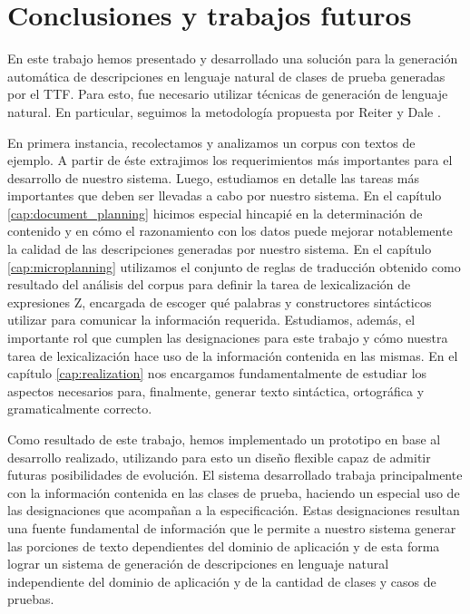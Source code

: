 \chapter{Conclusiones y trabajos futuros}
\label{cap:conclusion}

En este trabajo hemos presentado y desarrollado una solución para la generación automática de descripciones en lenguaje natural de clases de prueba generadas por el TTF. Para esto, fue necesario utilizar técnicas de generación de lenguaje natural. En particular, seguimos la metodología propuesta por Reiter y Dale \cite{reiter_dale}.

En primera instancia, recolectamos y analizamos un corpus con textos de ejemplo. A partir de éste extrajimos los requerimientos más importantes para el desarrollo de nuestro sistema. Luego, estudiamos en detalle las tareas más importantes que deben ser llevadas a cabo por nuestro sistema. En el capítulo \ref{cap:document_planning} hicimos especial hincapié en la determinación de contenido y en cómo el razonamiento con los datos puede mejorar notablemente la calidad de las descripciones generadas por nuestro sistema. En el capítulo \ref{cap:microplanning} utilizamos el conjunto de reglas de traducción obtenido como resultado del análisis del corpus para definir la tarea de lexicalización de expresiones Z, encargada de escoger qué palabras y constructores sintácticos utilizar para comunicar la información requerida. Estudiamos, además, el importante rol que cumplen las designaciones para este trabajo y cómo nuestra tarea de lexicalización hace uso de la información contenida en las mismas. En el capítulo \ref{cap:realization} nos encargamos fundamentalmente de estudiar los aspectos necesarios para, finalmente, generar texto sintáctica, ortográfica y gramaticalmente correcto.

Como resultado de este trabajo, hemos implementado un prototipo en base al desarrollo realizado, utilizando para esto un diseño flexible capaz de admitir futuras posibilidades de evolución. El sistema desarrollado trabaja principalmente con la información contenida en las clases de prueba, haciendo un especial uso de las designaciones que acompañan a la especificación. Estas designaciones resultan una fuente fundamental de información que le permite a nuestro sistema generar las porciones de texto dependientes del dominio de aplicación y de esta forma lograr un sistema de generación de descripciones en lenguaje natural independiente del dominio de aplicación y de la cantidad de clases y casos de pruebas.

